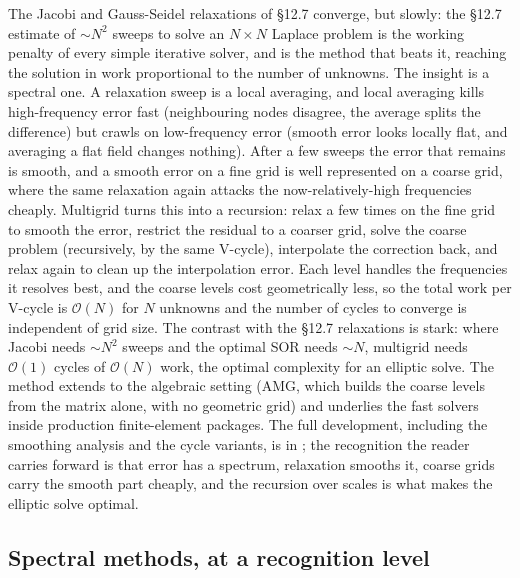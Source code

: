 \begin{mastery}
The Jacobi and Gauss-Seidel relaxations of §12.7 converge, but
slowly: the §12.7 estimate of $\sim N^{2}$ sweeps to solve an
$N\times N$ Laplace problem is the working penalty of every simple
iterative solver, and  is the method that beats
it, reaching the solution in work proportional to the number of
unknowns. The insight is a spectral one. A relaxation sweep is a
local averaging, and local averaging kills high-frequency error fast
(neighbouring nodes disagree, the average splits the difference) but
crawls on low-frequency error (smooth error looks locally flat, and
averaging a flat field changes nothing). After a few sweeps the
error that remains is smooth, and a smooth error on a fine grid is
well represented on a coarse grid, where the same relaxation again
attacks the now-relatively-high frequencies cheaply. Multigrid turns
this into a recursion: relax a few times on the fine grid to smooth
the error, restrict the residual to a coarser grid, solve the coarse
problem (recursively, by the same V-cycle), interpolate the
correction back, and relax again to clean up the interpolation error.
Each level handles the frequencies it resolves best, and the coarse
levels cost geometrically less, so the total work per V-cycle is
$\mathcal{O}(N)$ for $N$ unknowns and the number of cycles to
converge is independent of grid size. The contrast with the §12.7
relaxations is stark: where Jacobi needs $\sim N^{2}$ sweeps and the
optimal SOR needs $\sim N$, multigrid needs $\mathcal{O}(1)$ cycles
of $\mathcal{O}(N)$ work, the optimal complexity for an elliptic
solve. The method extends to the algebraic setting (AMG, which builds
the coarse levels from the matrix alone, with no geometric grid) and
underlies the fast solvers inside production finite-element packages.
The full development, including the smoothing analysis and the cycle
variants, is in \textcite{text:v2ch12-leveque-fdm}; the recognition
the reader carries forward is that error has a spectrum, relaxation
smooths it, coarse grids carry the smooth part cheaply, and the
recursion over scales is what makes the elliptic solve optimal.
\end{mastery}

\subsection{Spectral methods, at a recognition level}

